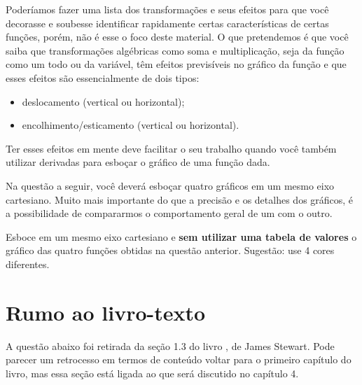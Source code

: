 \documentclass[main_estudante.tex]{subfiles}
\begin{document}
Poderíamos fazer uma lista dos transformações e seus efeitos para que você decorasse e soubesse identificar rapidamente certas características de certas funções, porém, não é esse o foco deste material. O que pretendemos é que você saiba que transformações algébricas como soma e multiplicação, seja da função como um todo ou da variável, têm efeitos previsíveis no gráfico da função e que esses efeitos são essencialmente de dois tipos:

\begin{itemize}
 \item deslocamento (vertical ou horizontal);
 \item encolhimento/esticamento (vertical ou horizontal).
\end{itemize}

Ter esses efeitos em mente deve facilitar o seu trabalho quando você também utilizar derivadas para esboçar o gráfico de uma função dada.

Na questão a seguir, você deverá esboçar quatro gráficos em um mesmo eixo cartesiano. Muito mais importante do que a precisão e os detalhes dos gráficos, é a possibilidade de compararmos o comportamento geral de um com o outro.

\begin{questao}
Esboce em um mesmo eixo cartesiano e \textbf{sem utilizar uma tabela de valores} o gráfico das quatro funções obtidas na questão anterior. Sugestão: use 4 cores diferentes.
\end{questao}

\newpage

\section{Rumo ao livro-texto}

A questão abaixo foi retirada da seção 1.3 do livro , de James Stewart. Pode parecer um retrocesso em termos de conteúdo voltar para o primeiro capítulo do livro, mas essa seção está ligada ao que será discutido no capítulo 4.
\end{document}
